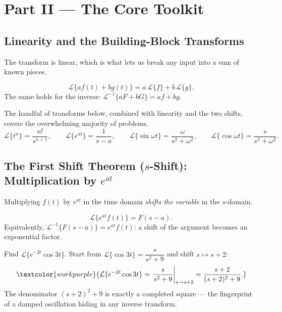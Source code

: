 \clearpage
{}
{}
\section*{Part II --- The Core Toolkit}

\subsection{Linearity and the Building-Block Transforms}

The transform is linear, which is what lets us break any input into a sum of known
pieces.

\begin{formulabox}[Linearity]
\[ \mathcal{L}\{a f(t) + b g(t)\} = a\,\mathcal{L}\{f\} + b\,\mathcal{L}\{g\}. \]
The same holds for the inverse: $\mathcal{L}^{-1}\{aF+bG\} = af + bg$.
\end{formulabox}

The handful of transforms below, combined with linearity and the two shifts, covers
the overwhelming majority of problems.
\[
\mathcal{L}\{t^n\} = \frac{n!}{s^{n+1}}, \qquad
\mathcal{L}\{e^{at}\} = \frac{1}{s-a}, \qquad
\mathcal{L}\{\sin\omega t\} = \frac{\omega}{s^2+\omega^2}, \qquad
\mathcal{L}\{\cos\omega t\} = \frac{s}{s^2+\omega^2}.
\]

\subsection{The First Shift Theorem ($s$-Shift): Multiplication by $e^{at}$}

Multiplying $f(t)$ by $e^{at}$ in the time domain \emph{shifts the variable} in the
$s$-domain.

\begin{formulabox}
\[ \mathcal{L}\{e^{at} f(t)\} = F(s-a). \]
Equivalently, $\mathcal{L}^{-1}\{F(s-a)\} = e^{at} f(t)$: a shift of the argument
becomes an exponential factor.
\end{formulabox}

\begin{examplebox}
Find $\mathcal{L}\{e^{-2t}\cos 3t\}$. Start from $\mathcal{L}\{\cos 3t\}
= \dfrac{s}{s^2+9}$ and shift $s \mapsto s+2$:
\[ \textcolor{workpurple}{\mathcal{L}\{e^{-2t}\cos 3t\}
   = \left.\frac{s}{s^2+9}\right|_{s\to s+2}
   = \frac{s+2}{(s+2)^2+9}.} \]
The denominator $(s+2)^2+9$ is exactly a completed square --- the fingerprint of a
damped oscillation hiding in any inverse transform.
\end{examplebox}


